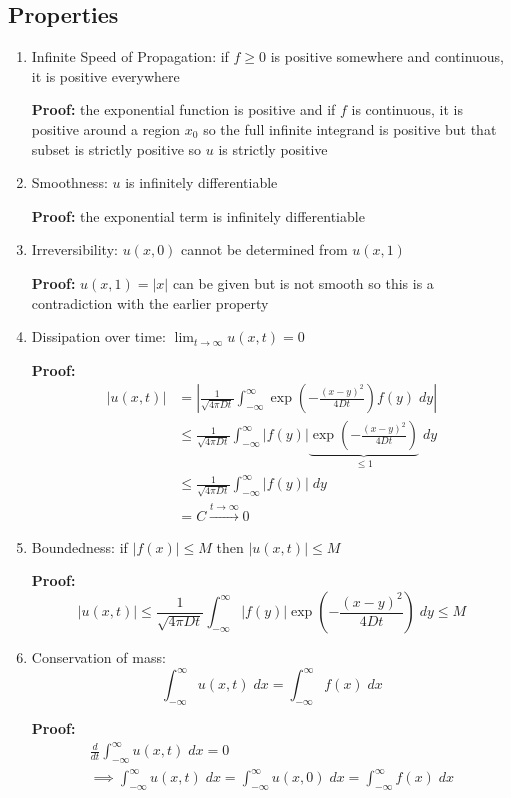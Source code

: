 \documentclass[10pt]{article}
\begin{document}
\subsection{Properties}
\begin{enumerate}
    \item Infinite Speed of Propagation: if $f \geq0$ is positive somewhere and continuous, it is positive everywhere 
    
    \textbf{Proof:} the exponential function is positive and if $f$ is continuous, it is positive around a region $x_0$ so the full infinite integrand is positive but that subset is strictly positive so $u$ is strictly positive 

    \item Smoothness: $u$ is infinitely differentiable 
    
    \textbf{Proof:} the exponential term is infinitely differentiable

    \item Irreversibility: $u(x, 0)$ cannot be determined from $u(x, 1)$ 
    
    \textbf{Proof:} $u(x, 1) = |x|$ can be given but is not smooth so this is a contradiction with the earlier property 

    \item Dissipation over time: $\lim_{t\to \infty} u(x, t) = 0$
    
    \textbf{Proof:} 
    \begin{align*}
        |u(x, t)| &= \left|\frac{1}{\sqrt{4\pi Dt}} \int_{-\infty}^{\infty} \exp(-\frac{(x-y)^2}{4Dt})f(y)\; dy\right|\\
        &\leq \frac{1}{\sqrt{4\pi Dt}} \int_{-\infty}^{\infty} |f(y)| \underbrace{\exp(-\frac{(x-y)^2}{4Dt})}_{\leq 1} \; dy\\
        &\leq \frac{1}{\sqrt{4\pi Dt}} \int_{-\infty}^{\infty} |f(y)| \; dy\\
        &= C \overset{t \to \infty}{\longrightarrow} 0
    \end{align*}

    \item Boundedness: if $|f(x)| \leq M$ then $|u(x, t)| \leq M$ 
    
    \textbf{Proof:}
    \[|u(x, t)| \leq \frac{1}{\sqrt{4\pi Dt}} \int_{-\infty}^{\infty} |f(y)| \exp(-\frac{(x-y)^2}{4Dt})\; dy \leq M\]

    \item Conservation of mass:
    \[\int_{-\infty}^{\infty} u(x, t)\; dx = \int_{-\infty}^{\infty} f(x)\; dx\]

    \textbf{Proof:} 
    \begin{gather*}
        \frac{d}{dt}\int_{-\infty}^{\infty} u(x, t)\; dx = 0\\
        \implies \int_{-\infty}^{\infty} u(x, t)\; dx = \int_{-\infty}^{\infty} u(x, 0) \; dx = \int_{-\infty}^{\infty} f(x)\; dx
    \end{gather*}
\end{enumerate}
\end{document}

